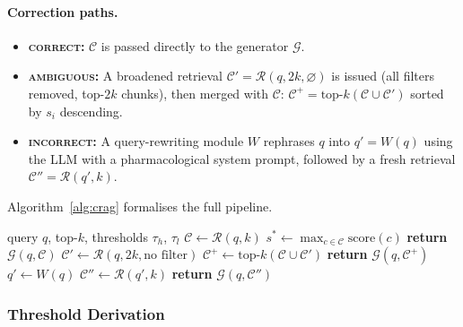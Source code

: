 \documentclass[10pt, twocolumn]{article}
\begin{document}
\paragraph{Correction paths.}
\begin{itemize}[leftmargin=*,itemsep=2pt]
  \item \textbf{\textsc{correct}:} $\mathcal{C}$ is passed directly to
        the generator $\mathcal{G}$.
  \item \textbf{\textsc{ambiguous}:} A broadened retrieval $\mathcal{C}'
        = \mathcal{R}(q, 2k, \varnothing)$ is issued (all filters
        removed, top-$2k$ chunks), then merged with $\mathcal{C}$:
        $\mathcal{C}^+ = \text{top-}k(\mathcal{C} \cup \mathcal{C}')$
        sorted by $s_i$ descending.
  \item \textbf{\textsc{incorrect}:} A query-rewriting module $W$
        rephrases $q$ into $q' = W(q)$ using the LLM with a
        pharmacological system prompt, followed by a fresh retrieval
        $\mathcal{C}'' = \mathcal{R}(q', k)$.
\end{itemize}

Algorithm~\ref{alg:crag} formalises the full pipeline.

\begin{algorithm}[H]
  \caption{CRAG Inference Pipeline}
  \label{alg:crag}
  \begin{algorithmic}[1]
    \Require query $q$, top-$k$, thresholds $\tau_h$, $\tau_l$
    \State $\mathcal{C} \leftarrow \mathcal{R}(q, k)$
    \State $s^{*} \leftarrow \max_{c \in \mathcal{C}} \text{score}(c)$
      \State \textbf{return} $\mathcal{G}(q, \mathcal{C})$
      \State $\mathcal{C}' \leftarrow \mathcal{R}(q, 2k, \text{no filter})$
      \State $\mathcal{C}^+ \leftarrow \text{top-}k(\mathcal{C} \cup \mathcal{C}')$
      \State \textbf{return} $\mathcal{G}(q, \mathcal{C}^+)$
    \Else
      \State $q' \leftarrow W(q)$
      \State $\mathcal{C}'' \leftarrow \mathcal{R}(q', k)$
      \State \textbf{return} $\mathcal{G}(q, \mathcal{C}'')$
    \EndIf
  \end{algorithmic}
\end{algorithm}

\subsubsection{Threshold Derivation}
\label{sec:threshold}
\end{document}
